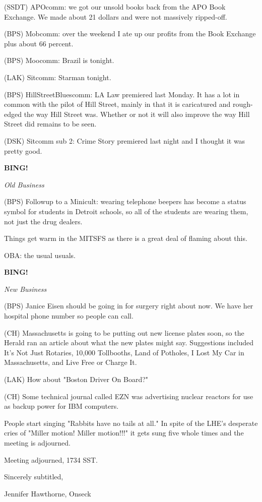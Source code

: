 \documentclass[12pt]{article}
\newcommand{\bing}{{\bf BING!} }
\newcommand{\goto}[1]{\bing \vskip 12pt \centerline{{\em{#1}}}}
\begin{document}
(SSDT) APOcomm: we got our unsold books back from the APO Book Exchange. We made about 21 dollars and were not massively ripped-off.

(BPS) Mobcomm: over the weekend I ate up our profits from the Book Exchange plus about 66 percent.

(BPS) Moocomm: Brazil is tonight.

(LAK) Sitcomm: Starman tonight.

(BPS) HillStreetBluescomm: LA Law premiered last Monday. It has a lot in common with the pilot of Hill Street, mainly in that it is caricatured and rough-edged the way Hill Street was. Whether or not it will also improve the way Hill Street did remains to be seen.

(DSK) Sitcomm sub 2: Crime Story premiered last night and I thought it was pretty good.

\goto{Old Business}

(BPS) Followup to a Minicult: wearing telephone beepers has become a status symbol for students in Detroit schools, so all of the students are wearing them, not just the drug dealers.

Things get warm in the MITSFS as there is a great deal of flaming about this.

OBA: the usual usuals.

\goto{New Business}

(BPS) Janice Eisen should be going in for surgery right about now. We have her hospital phone number so people can call.

(CH) Massachusetts is going to be putting out new license plates soon, so the Herald ran an article about what the new plates might say. Suggestions included It's Not Just Rotaries, 10,000 Tollbooths, Land of Potholes, I Lost My Car in Massachusetts, and Live Free or Charge It.

(LAK) How about "Boston Driver On Board?"

(CH) Some technical journal called EZN was advertising nuclear reactors for use as backup power for IBM computers.

People start singing "Rabbits have no tails at all." In spite of the LHE's desperate cries of "Miller motion! Miller motion!!!" it gets sung five whole times and the meeting is adjourned.

\vspace{12pt}

\noindent
Meeting adjourned, 1734 SST.

\vspace{18pt}

\centerline{Sincerely subtitled,}
\centerline{Jennifer Hawthorne, Onseck}
\end{document}
